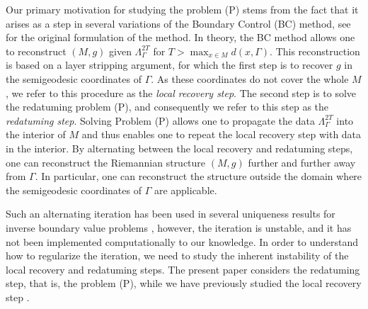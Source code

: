 \documentclass[final,leqno]{siamart1116}
\begin{document}
Our primary motivation for studying the problem (P) stems from the
fact that it arises as a step in several variations of the Boundary Control (BC) method, see \cite{Belishev1987} for the original formulation of the method. In
theory, the BC method allows one to reconstruct $(M,g)$ given
$\Lambda_\Gamma^{2T}$ for $T > \max_{x \in M} d(x,\Gamma)$. This
reconstruction is based on a layer stripping argument, for which the
first step is to recover $g$ in the semigeodesic coordinates of
$\Gamma$. 
As these coordinates do not cover the whole $M$,
we refer to this procedure as the {\em local recovery step}. 
The second step is to
solve the redatuming problem (P), and consequently we refer to this
step as the {\em redatuming step}. Solving Problem (P)
allows one to propagate the data $\Lambda_\Gamma^{2T}$ into the interior
of $M$ and thus enables one to repeat the local recovery step with
data in the interior.
By alternating between the local recovery and redatuming steps, one can
reconstruct the Riemannian structure $(M,g)$ further and further away
from $\Gamma$. In particular, one can reconstruct the structure
outside the domain where the semigeodesic coordinates of $\Gamma$ are
applicable. 

Such an alternating iteration has been used in several uniqueness results for inverse boundary value problems \cite{Isozaki2010, Katchalov2001,Kurylev2015,Lassas2014},
however, the iteration is unstable, and it has not been
implemented computationally to our knowledge. In order to understand
how to regularize the iteration, 
we need to study the inherent instability of the local recovery and redatuming steps. 
The present paper considers the redatuming step,
that is, the problem (P), while we have previously studied the
local recovery step \cite{Hoop2016}.
\end{document}
